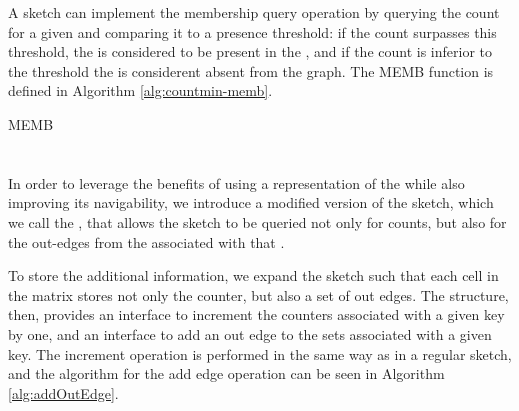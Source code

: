 
A \cm sketch can implement the membership query operation by querying the count for a given \kmer and comparing it to a presence threshold:
if the count surpasses this threshold, the \kmer is considered to be present in the \dBG, and if the count is inferior to the threshold the
\kmer is considerent absent from the graph. The MEMB function is defined in Algorithm \ref{alg:countmin-memb}.

\begin{algorithm}[htbp]
  \caption{MEMB}\label{alg:countmin-memb}
\end{algorithm}

\section{\dBCM}
\label{sec:debruijncountmin}



In order to leverage the benefits of using a \cm representation of the \dBG while also improving its navigability, we introduce a modified
version of the \cm sketch, which we call the \dBCM, that allows the sketch to be queried not only for \kmer counts, but also for the
out-edges from the \dBG associated with that \kmer. 

To store the additional information, we expand the \cm sketch such that each cell in the matrix stores not only the counter,
but also a set of out edges. The structure, then, provides an interface to increment the counters associated with a given key by one,
and an interface to add an out edge to the sets associated with a given key. The increment operation is performed in the same way as in
a regular \cm sketch, and the algorithm for the add edge operation can be seen in Algorithm \ref{alg:addOutEdge}.

